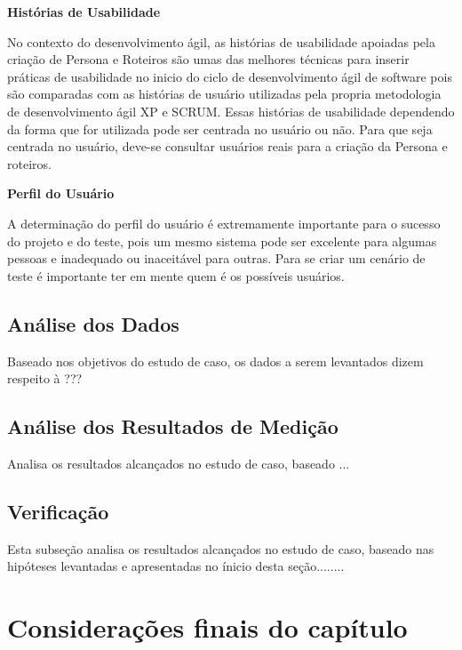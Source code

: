 \textbf{Histórias de Usabilidade}

	No contexto do desenvolvimento ágil, as histórias de usabilidade apoiadas pela criação de Persona e Roteiros são umas das melhores técnicas para inserir práticas de usabilidade no inicio do ciclo de desenvolvimento ágil de software pois são comparadas com as histórias de usuário utilizadas pela propria metodologia de desenvolvimento ágil XP e SCRUM. Essas histórias de usabilidade dependendo da forma que for utilizada pode ser centrada no usuário ou não. Para que seja centrada no usuário, deve-se consultar usuários reais para a criação da Persona e roteiros.

\textbf{Perfil do Usuário}

	A determinação do perfil do usuário é extremamente importante para o sucesso 
do projeto e do teste, pois um mesmo sistema pode ser excelente para algumas pessoas e 
inadequado ou inaceitável para outras. Para se criar um cenário de teste é importante ter em mente quem é os possíveis usuários.

\subsection{Análise dos Dados}

Baseado nos objetivos do estudo de caso, os dados a serem levantados dizem respeito à ???

\subsection{Análise dos Resultados de Medição}

Analisa os resultados alcançados no estudo de caso, baseado ...

\subsection{Verificação}

Esta subseção analisa os resultados alcançados no estudo de caso, baseado nas hipóteses levantadas e apresentadas no ínicio desta seção........


\section{Considerações finais do capítulo}







